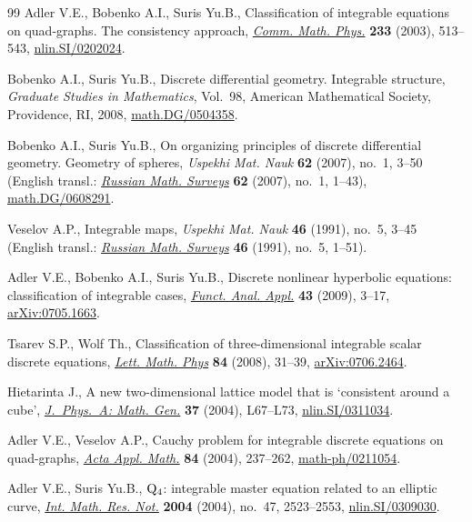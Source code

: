 \documentclass[pdftex]{sigma}
\begin{document}
\begin{thebibliography}{99}
Adler V.E., Bobenko A.I., Suris Yu.B.,
Classif\/ication of integrable equations on quad-graphs. The consistency approach,
\href{http://dx.doi.org/10.1007/s00220-002-0762-8}{{\it Comm. Math. Phys.}} {\bf 233} (2003), 513--543,
\href{http://arxiv.org/abs/nlin.SI/0202024}{nlin.SI/0202024}.


Bobenko A.I., Suris Yu.B.,
Discrete dif\/ferential geometry. Integrable structure,
{\it Graduate Studies in Mathematics}, Vol.~98, American Mathematical Society, Providence, RI, 2008,
\href{http://arxiv.org/abs/math.DG/0504358}{math.DG/0504358}.


Bobenko A.I., Suris Yu.B.,
On organizing principles of discrete dif\/ferential geometry. Geometry of spheres,
{\it Uspekhi Mat. Nauk} {\bf 62} (2007), no.~1, 3--50
(English transl.: \href{http://dx.doi.org/10.1070/RM2007v062n01ABEH004380}{{\it Russian Math. Surveys}} {\bf 62} (2007), no.~1, 1--43),
\href{http://arxiv.org/abs/math.DG/0608291}{math.DG/0608291}.


Veselov A.P.,
Integrable maps, {\it Uspekhi Mat. Nauk} {\bf 46} (1991), no.~5, 3--45
(English transl.: \href{http://dx.doi.org/10.1070/RM1991v046n05ABEH002856}{{\it Russian Math. Surveys}} {\bf 46} (1991), no.~5, 1--51).


Adler V.E., Bobenko A.I., Suris Yu.B.,
Discrete nonlinear hyperbolic equations: classif\/ication of integrable cases,
\href{http://dx.doi.org/10.1007/s10688-009-0002-5}{{\it Funct. Anal. Appl.}} {\bf 43} (2009), 3--17,
\href{http://arxiv.org/abs/0705.1663}{arXiv:0705.1663}.


Tsarev S.P., Wolf Th.,
Classif\/ication of three-dimensional integrable scalar discrete equations,
\href{http://dx.doi.org/10.1007/s11005-008-0230-2}{{\it Lett. Math. Phys}} {\bf 84} (2008), 31--39,
\href{http://arxiv.org/abs/0706.2464}{arXiv:0706.2464}.


Hietarinta J.,
A new two-dimensional lattice model that is `consistent around a cube',
\href{http://dx.doi.org/10.1088/0305-4470/37/6/L01}{{\it J.~Phys.~A: Math. Gen.}} {\bf 37} (2004), L67--L73,
\href{http://arxiv.org/abs/nlin.SI/0311034}{nlin.SI/0311034}.


Adler V.E., Veselov A.P.,
Cauchy problem for integrable discrete equations on quad-graphs,
\href{http://dx.doi.org/10.1007/s10440-004-5557-9}{{\it Acta Appl. Math.}} {\bf 84} (2004), 237--262,
\href{http://arxiv.org/abs/math-ph/0211054}{math-ph/0211054}.


Adler V.E., Suris Yu.B.,
${\rm Q}_4$: integrable master equation related to an elliptic curve,
\href{http://dx.doi.org/10.1155/S107379280413273X}{{\it Int. Math. Res. Not.}} {\bf 2004} (2004), no.~47, 2523--2553,
\href{http://arxiv.org/abs/nlin.SI/0309030}{nlin.SI/0309030}.



\end{thebibliography}\LastPageEnding
\end{document}
